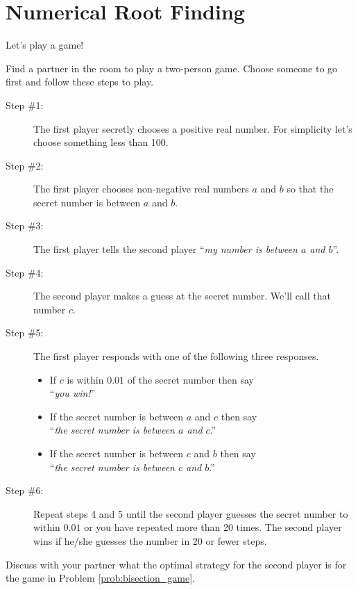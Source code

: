 \chapter{Numerical Root Finding}
Let's play a game!
\begin{problem}\label{prob:bisection_game}
    Find a partner in the room to play a two-person game.  Choose someone to go first and
    follow these steps to play.
    \begin{description}
        \item[Step \#1:] The first player secretly chooses a positive real number. For
            simplicity let's choose something less than 100.
        \item[Step \#2:] The first player chooses non-negative real numbers $a$ and $b$ so that the
            secret number is between $a$ and $b$.  
        \item[Step \#3:] The first player tells the second player ``{\it my number is between $a$
            and $b$}''.
        \item[Step \#4:] The second player makes a guess at the secret number.  We'll call
            that number $c$.
        \item[Step \#5:] The first player responds with one of the following three
            responses.
            \begin{itemize}
                \item If $c$ is within $0.01$ of the secret number then say\\ ``{\it you win!}''
                \item If the secret number is between $a$ and $c$ then say\\ ``{\it the secret
                number is between $a$ and $c$}.''
                \item If the secret number is between $c$ and $b$ then say\\ ``{\it the secret
                number is between $c$ and $b$}.''
            \end{itemize}
        \item[Step \#6:] Repeat steps 4 and 5 until the second player guesses the secret
            number to within $0.01$ or you have repeated more than 20 times. The second
            player wins if he/she guesses the number in 20 or fewer steps.
    \end{description}
\end{problem}

\begin{problem}
    Discuss with your partner what the optimal strategy for the second player is for the
    game in Problem \ref{prob:bisection_game}.
\end{problem}

